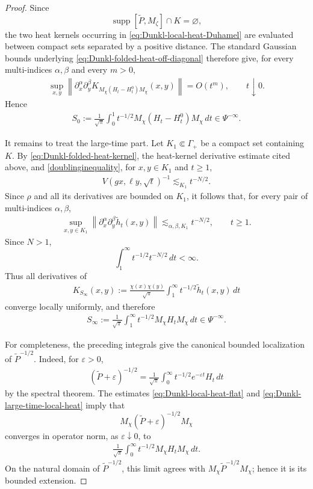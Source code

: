 \documentclass{amsart}
\begin{document}
\begin{proof}
Since
\[
\operatorname{supp}[\widetilde P,M_\zeta]
\cap K
=
\varnothing,
\]
the two heat kernels occurring in
\eqref{eq:Dunkl-local-heat-Duhamel} are evaluated between compact
sets separated by a positive distance. The standard Gaussian
bounds underlying
\eqref{eq:Dunkl-folded-heat-off-diagonal} therefore give, for every
multi-indices \(\alpha,\beta\) and every \(m>0\),
\begin{align}
\sup_{x,y}
\left\|
\partial_x^\alpha\partial_y^\beta
K_{M_\chi(H_t-H_t^0)M_\chi}(x,y)
\right\|
=
O(t^m),
\qquad
t\downarrow0.
\label{eq:Dunkl-local-heat-flat}
\end{align}
Hence
\begin{align}
S_0
:=
\frac1{\sqrt\pi}
\int_0^1
t^{-1/2}
M_\chi(H_t-H_t^0)M_\chi\,dt
\in
\Psi^{-\infty}.
\label{eq:Dunkl-small-time-smoothing}
\end{align}

It remains to treat the large-time part. Let \(K_1\Subset\Gamma_+\)
be a compact set containing \(K\). By
\eqref{eq:Dunkl-folded-heat-kernel}, the heat-kernel derivative
estimate cited above, and \eqref{doublinginequality}, for
\(x,y\in K_1\) and \(t\geq1\),
\begin{align*}
V(gx,\ell y,\sqrt t)^{-1}
\lesssim_{K_1}
t^{-N/2}.
\end{align*}
Since \(\rho\) and all its derivatives are bounded on \(K_1\), it
follows that, for every pair of multi-indices \(\alpha,\beta\),
\begin{align}
\sup_{x,y\in K_1}
\left\|
\partial_x^\alpha
\partial_y^\beta
\widetilde h_t(x,y)
\right\|
\lesssim_{\alpha,\beta,K_1}
t^{-N/2},
\qquad
t\geq1.
\label{eq:Dunkl-large-time-local-heat}
\end{align}
Since \(N>1\),
\[
\int_1^\infty
t^{-1/2}t^{-N/2}\,dt
<
\infty.
\]
Thus all derivatives of
\begin{align*}
K_{S_\infty}(x,y)
:=
\frac{\chi(x)\chi(y)}{\sqrt\pi}
\int_1^\infty
t^{-1/2}\widetilde h_t(x,y)\,dt
\end{align*}
converge locally uniformly, and therefore
\begin{align}
S_\infty
:=
\frac1{\sqrt\pi}
\int_1^\infty
t^{-1/2}
M_\chi H_tM_\chi\,dt
\in
\Psi^{-\infty}.
\label{eq:Dunkl-large-time-smoothing}
\end{align}

For completeness, the preceding integrals give the canonical bounded
localization of \(\widetilde P^{-1/2}\). Indeed, for
\(\varepsilon>0\),
\begin{align*}
(\widetilde P+\varepsilon)^{-1/2}
=
\frac1{\sqrt\pi}
\int_0^\infty
t^{-1/2}e^{-\varepsilon t}H_t\,dt
\end{align*}
by the spectral theorem. The estimates
\eqref{eq:Dunkl-local-heat-flat} and
\eqref{eq:Dunkl-large-time-local-heat} imply that
\[
M_\chi(\widetilde P+\varepsilon)^{-1/2}M_\chi
\]
converges in operator norm, as \(\varepsilon\downarrow0\), to
\begin{align*}
\frac1{\sqrt\pi}
\int_0^\infty
t^{-1/2}M_\chi H_tM_\chi\,dt.
\end{align*}
On the natural domain of \(\widetilde P^{-1/2}\), this limit agrees
with \(M_\chi\widetilde P^{-1/2}M_\chi\); hence it is its bounded
extension.


\end{proof}
\end{document}

